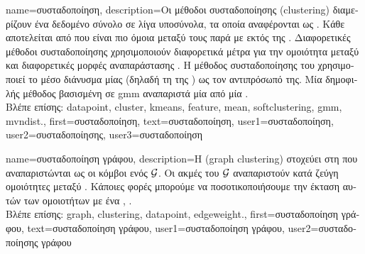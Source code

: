{name={\foreignlanguage{greek}{συσταδοποίηση}}, 
	description={\foreignlanguage{greek}{Οι μέθοδοι συσταδοποίησης} (clustering) 
		\foreignlanguage{greek}{διαμερίζουν ένα δεδομένο σύ\-νο\-λο}
		 \foreignlanguage{greek}{σε λίγα υποσύνολα, τα οποία αναφέρονται ως} . 
		\foreignlanguage{greek}{Κάθε}  \foreignlanguage{greek}{αποτελείται από}  \foreignlanguage{greek}{που 
		είναι πιο όμοια μεταξύ τους παρά με}  \foreignlanguage{greek}{εκτός της} . 
		\foreignlanguage{greek}{Διαφορετικές μέθοδοι συσταδοποίησης  
		χρησιμοποιούν διαφορετικά μέτρα για την ομοιότητα μεταξύ}  \foreignlanguage{greek}{και διαφορετικές μορφές 
		αναπαράστασης} . \foreignlanguage{greek}{Η μέθοδος συσταδοποίησης του}  
		\foreignlanguage{greek}{χρησιμοποιεί το μέσο διάνυσμα}  \foreignlanguage{greek}{μίας}  
		\foreignlanguage{greek}{(δηλαδή τη}  \foreignlanguage{greek}{της} ) \foreignlanguage{greek}{ως 
		τον αντιπρόσωπό της. Μία δημοφιλής μέθοδος}  \foreignlanguage{greek}{βασισμένη σε} \gls{gmm}  
		\foreignlanguage{greek}{αναπαριστά μία}  \foreignlanguage{greek}{από μία} .\\
		\foreignlanguage{greek}{Βλέπε επίσης:} \gls{datapoint}, \gls{cluster}, \gls{kmeans}, \gls{feature}, \gls{mean}, \gls{softclustering}, \gls{gmm}, \gls{mvndist}.},
		first={\foreignlanguage{greek}{συσταδοποίηση}},
		text={\foreignlanguage{greek}{συσταδοποίηση}},
		user1={\foreignlanguage{greek}{συσταδοποίηση}}, %
		user2={\foreignlanguage{greek}{συσταδοποίησης}}, %
		user3={\foreignlanguage{greek}{συσταδοποίηση}} %
}

{name={\foreignlanguage{greek}{συσταδοποίηση γράφου}},
	description={\foreignlanguage{greek}{Η}   
		(graph clustering) \foreignlanguage{greek}{στοχεύει στη}   \foreignlanguage{greek}{που 
		αναπαριστώνται ως οι κόμβοι ενός}  $\mathcal{G}$. \foreignlanguage{greek}{Οι ακμές του $\mathcal{G}$ αναπαριστούν 
		κατά ζεύγη ομοιότητες μεταξύ} . \foreignlanguage{greek}{Κάποιες φορές μπορούμε να 
		ποσοτικοποιήσουμε την έκταση αυτών των ομοιοτήτων με ένα}  \cite{Luxburg2007}, \cite{FlowSpecClustering2021}.\\
		\foreignlanguage{greek}{Βλέπε επίσης:} \gls{graph}, \gls{clustering}, \gls{datapoint}, \gls{edgeweight}.}, 
	first={\foreignlanguage{greek}{συσταδοποίηση γράφου}},
	text={\foreignlanguage{greek}{συσταδοποίηση γράφου}},
	user1={\foreignlanguage{greek}{συσταδοποίηση γράφου}}, %
    	user2={\foreignlanguage{greek}{συσταδοποίησης γράφου}} %
}

